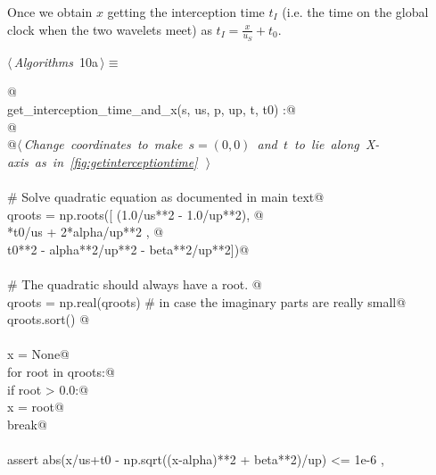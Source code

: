 \documentclass[10pt, english, oneside]{report}
\begin{document}
Once we obtain $x$ getting the interception time $t_I$ (i.e. the time on the global clock 
when the two wavelets meet) as $t_I = \frac{x}{u_S} + t_0$.

\begin{flushleft} \small
\begin{minipage}{\linewidth}\label{scrap6}\raggedright\small
{} $\langle\,${\itshape Algorithms}\nobreak\ {\footnotesize {10a}}$\,\rangle\equiv$
\vspace{-1ex}
\begin{list}{}{} \item
\mbox{}\verb@ @\\
\mbox{}\verb@def get_interception_time_and_x(s, us, p, up, t, t0) :@\\
\mbox{}\verb@    @\\
\mbox{}\verb@    @\hbox{$\langle\,${\itshape Change coordinates to make $s=(0,0)$ and $t$ to lie along X-axis as in \autoref{fig:getinterceptiontime}}\nobreak\ {\footnotesize {}}$\,\rangle$}\verb@@\\
\mbox{}\verb@@\\
\mbox{}\verb@    # Solve quadratic equation as documented in main text@\\
\mbox{}\verb@    qroots = np.roots([ (1.0/us**2 - 1.0/up**2), @\\
\mbox{}*t0/us + 2*alpha/up**2 , @\\
\mbox{}\verb@                        t0**2 - alpha**2/up**2 - beta**2/up**2])@\\
\mbox{}\verb@@\\
\mbox{}\verb@    # The quadratic should always have a root. @\\
\mbox{}\verb@    qroots = np.real(qroots) # in case the imaginary parts are really small@\\
\mbox{}\verb@    qroots.sort()            @\\
\mbox{}\verb@@\\
\mbox{}\verb@    x = None@\\
\mbox{}\verb@    for root in qroots:@\\
\mbox{}\verb@        if root > 0.0:@\\
\mbox{}\verb@           x = root@\\
\mbox{}\verb@           break@\\
\mbox{}\verb@@\\
\mbox{}\verb@    assert abs(x/us+t0 - np.sqrt((x-alpha)**2 + beta**2)/up) <= 1e-6 , \@\\

\end{list}
\end{minipage}
\end{flushleft}
\end{document}
